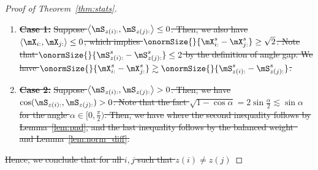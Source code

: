 \documentclass[lettersize,onecolumn,journal]{IEEEtran}
\theoremstyle{definition}
\theoremstyle{definition}
\newcommand{\ang}[1]{\left\langle#1\right\rangle}
\providecommand{\DIFdeltex}[1]{{\protect\color{red}\sout{#1}}}                      %
\providecommand{\DIFdel}[1]{\texorpdfstring{\DIFdeltex{#1}}{}} %
\begin{document}
\begin{proof}[Proof of Theorem~\ref{thm:stats}]
\begin{enumerate}%
\item%
\textbf{\DIFdel{Case 1:}} %
\DIFdel{Suppose $\ang{\mS_{z(i):}, \mS_{z(j):}} \leq 0$. Then, we also have $\ang{\mX_{i:},\mX_{j:}} \leq 0$, which implies $\onormSize{}{\mX_{i:}^s -  \mX_{j:}^s} \geq \sqrt{2}$. Note that $\onormSize{}{\mS_{z(i):}^s - \mS_{z(j):}^s} \leq 2$ by the definition of angle gap. We have $\onormSize{}{\mX_{i:}^s -  \mX_{j:}^s} \gtrsim \onormSize{}{\mS_{z(i):}^s - \mS_{z(j):}^s}$.
    }%
\item%
\textbf{\DIFdel{Case 2:}} %
\DIFdel{Suppose $\ang{\mS_{z(i):}, \mS_{z(j):}} > 0$. Then, we have $\cos(\mS_{z(i):}, \mS_{z(j):}) > 0$. Note that the fact $\sqrt{1 - \cos \alpha} = 2 \sin \frac{\alpha}{2} \lesssim \sin \alpha$ for the angle $\alpha \in [0, \frac{\pi}{2})$. Then, we have 
    }%
\DIFdel{where the second inequality follows by Lemma~\ref{lem:pad}, and the last inequality follows by the balanced weight~}%
\DIFdel{and Lemma~\ref{lem:norm_diff}.
}
\end{enumerate}%

\DIFdel{Hence, we conclude that for all $i,j$ such that $z(i) \neq z(j)$
}%


\end{proof}
\end{document}
